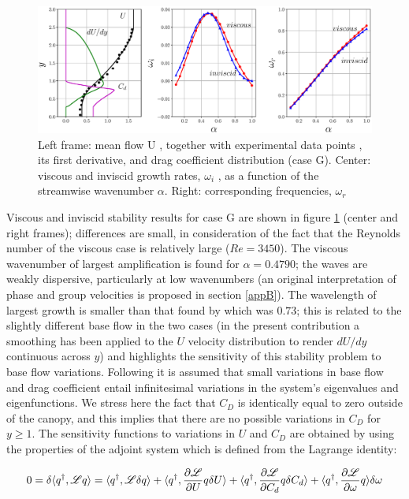 \begin{figure}[h]
	\centering
	\includegraphics[width=1\linewidth]{chapter_3/figure/2}
	\caption{Left frame: mean flow U , together with experimental data points \citet{ghisalberti2004limited},  its first derivative, and drag coefficient
		distribution (case G). Center: viscous and inviscid growth rates, $\omega_i$ , as a function of the streamwise wavenumber $\alpha$. Right:
		corresponding frequencies, $\omega_r$}
	\label{fig:2}
\end{figure}

Viscous and inviscid stability results for case G are shown in figure \ref{fig:2} (center and right frames);
differences are small, in consideration of the fact that the Reynolds number of the viscous case
is relatively large ($Re = 3450$). The viscous wavenumber of largest amplification is found for
$\alpha = 0.4790$; the waves are weakly dispersive, particularly at low wavenumbers (an original interpretation of phase and group velocities is proposed in section \ref{appB}). The wavelength of largest
growth is smaller than that found by \citet{zampogna2016instability} which was $0.73$; this is related to the slightly
different base flow in the two cases (in the present contribution a smoothing has been applied to the
$U$ velocity distribution to render $dU/dy$ continuous across $y$) and highlights the sensitivity of this
stability problem to base flow variations.
Following \citet{bottaro2003effect} it is assumed that small variations in base flow and drag coefficient
entail infinitesimal variations in the system’s eigenvalues and eigenfunctions. We stress here the fact
that $C_D$ is identically equal to zero outside of the canopy, and this implies that there are no possible
variations in $C_D$ for $y \geq 1$. 
\newpage
The sensitivity functions to variations in $U$ and $C_D$ are obtained by using
the properties of the adjoint system which is defined from the Lagrange identity:

\begin{equation}
0 = \delta \langle q^{\dagger}, \mathscr{L} q \rangle = 
\langle q^{\dagger}, \mathscr{L} \delta q \rangle +
\langle q^{\dagger}, \dfrac{\partial \mathscr{L}}{\partial U}  q \delta U\rangle +
\langle q^{\dagger}, \dfrac{\partial \mathscr{L}}{\partial C_d}  q \delta C_d\rangle +
\langle q^{\dagger}, \dfrac{\partial \mathscr{L}}{\partial \omega}  q \rangle \delta \omega
\label{eq:lagid}
\end{equation}

